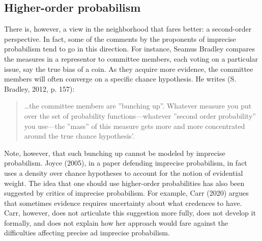 \documentclass[
  10pt,
  dvipsnames,enabledeprecatedfontcommands]{scrartcl}
\begin{document}
\hypertarget{higher-order-probabilism}{%
\subsection{Higher-order probabilism}\label{higher-order-probabilism}}

There is, however, a view in the neighborhood that fares better: a
second-order perspective. In fact, some of the comments by the
proponents of imprecise probabilism tend to go in this direction. For
instance, Seamus Bradley compares the measures in a representor to
committee members, each voting on a particular issue, say the true bias
of a coin. As they acquire more evidence, the committee members will
often converge on a specific chance hypothesis. He writes (S. Bradley,
2012, p. 157):

\begin{quote}
\dots the committee members are ''bunching up''. Whatever measure you put over the set of probability functions---whatever ''second order probability'' you use---the ''mass'' of this measure gets more and more concentrated around the true chance hypothesis'.
\end{quote}

\noindent Note, however, that such bunching up cannot be modeled by
imprecise probabilism. Joyce (2005), in a paper defending imprecise
probabilism, in fact uses a density over chance hypotheses to account
for the notion of evidential weight. The idea that one should use
higher-order probabilities has also been suggested by critics of
imprecise probabilism. For example, Carr (2020) argues that sometimes
evidence requires uncertainty about what credences to have. Carr,
however, does not articulate this suggestion more fully, does not
develop it formally, and does not explain how her approach would fare
against the difficulties affecting precise ad imprecise probabilism.
\end{document}
